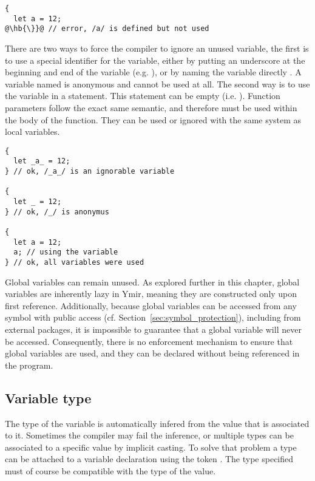 \begin{lstlisting}[style=coloredverbatim, escapechar=@]
{
  let a = 12;
@\hb{\}}@ // error, /a/ is defined but not used
\end{lstlisting}

There are two ways to force the compiler to ignore an unused variable, the first
is to use a special identifier for the variable, either by putting an underscore
at the beginning and end of the variable (e.g. ), or by naming the
variable directly \token{\_}. A variable named \token{\_} is anonymous and
cannot be used at all. The second way is to use the variable in a statement.
This statement can be empty (i.e. ). Function parameters follow the
exact same semantic, and therefore must be used within the body of the function.
They can be used or ignored with the same system as local variables.

\begin{lstlisting}[style=coloredverbatim, escapechar=@]
{
  let _a_ = 12;
} // ok, /_a_/ is an ignorable variable

{
  let _ = 12;
} // ok, /_/ is anonymus

{
  let a = 12;
  a; // using the variable
} // ok, all variables were used
\end{lstlisting}

Global variables can remain unused. As explored further in this chapter, global
variables are inherently lazy in Ymir, meaning they are constructed only upon
first reference. Additionally, because global variables can be accessed from any
symbol with public access (cf. Section~\ref{sec:symbol_protection}), including
from external packages, it is impossible to guarantee that a global variable
will never be accessed. Consequently, there is no enforcement mechanism to
ensure that global variables are used, and they can be declared without being
referenced in the program.

\subsection{Variable type}

The type of the variable is automatically infered from the value that is
associated to it. Sometimes the compiler may fail the inference, or multiple
types can be associated to a specific value by implicit casting. To solve that
problem a type can be attached to a variable declaration using the token
\token{:}. The type specified must of course be compatible with the type of the
value.

